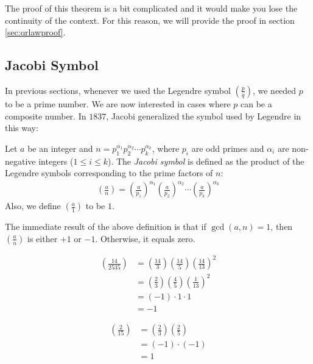 \documentclass[main.tex]{subfile}
\begin{document}
	The proof of this theorem is a bit complicated and it would make you lose the continuity of the context. For this reason, we will provide the proof in section \eqref{sec:qrlawproof}.

	\subsection{Jacobi Symbol}

	In previous sections, whenever we used the Legendre symbol $\left(\frac{p}{q}\right)$, we needed $p$ to be a prime number. We are now interested in cases where $p$ can be a composite number. In $1837$, Jacobi generalized the symbol used by Legendre in this way:

	\begin{definition}\label{def:jacobi}
		Let $a$ be an integer and $n=p_1^{\alpha_1}p_2^{\alpha_2}\cdots p_k^{\alpha_k}$, where $p_i$ are odd primes and $\alpha_i$ are non-negative integers ($1 \leq i \leq k$). The \textit{Jacobi symbol} is defined as the product of the Legendre symbols corresponding to the prime factors of $n$:
		\begin{align*}
		\left(\frac{a}{n}\right) = \left(\frac{a}{p_1}\right)^{\alpha_1}\left(\frac{a}{p_2}\right)^{\alpha_2}\cdots \left(\frac{a}{p_k}\right)^{\alpha_k}
		\end{align*}
		Also, we define $\left(\frac{a}{1}\right)$ to be $1$.
	\end{definition}

	\begin{remark}
			The immediate result of the above definition is that if $\gcd(a,n) = 1$, then $\left(\frac{a}{n}\right)$ is either $+1$ or $-1$. Otherwise, it equals zero.
	\end{remark}

	\begin{example}
		\begin{align*}
		\left(\frac{14}{2535}\right) &= \left(\frac{14}{3}\right)\left(\frac{14}{5}\right) \left(\frac{14}{13}\right)^{2}\\
		&= \left(\frac{2}{3}\right)\left(\frac{4}{5}\right) \left(\frac{1}{13}\right)^{2}\\
		&= (-1) \cdot 1 \cdot 1\\
		&= -1
		\end{align*}
	\end{example}

	\begin{example}
		\begin{align*}
			\left(\frac{2}{15}\right)
				& =\left(\frac{2}{3}\right)\left(\frac{2}{5}\right)\\
				& = (-1)\cdot (-1)\\
				& =1
		\end{align*}

	\end{example}
\end{document}
